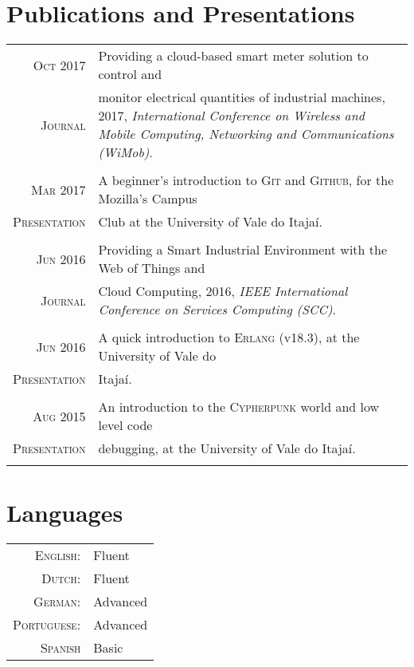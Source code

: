 \documentclass[a4paper,10pt]{article}
\begin{document}
\section{Publications and Presentations}
\begin{tabular}{r|p{11cm}}

\textsc{Oct} 2017 & Providing a cloud-based smart meter solution to control and \\\textsc{Journal} & monitor electrical quantities of industrial machines, 2017, \textit{International Conference on Wireless and Mobile Computing, Networking and Communications (WiMob)}. \normalsize \\\multicolumn{2}{c}{} \\

\textsc{Mar} 2017 & A beginner's introduction to \textsc{Git} and \textsc{Github}, for the Mozilla's Campus \\\textsc{Presentation} & Club at the University of Vale do Itajaí. \normalsize \\\multicolumn{2}{c}{} \\

\textsc{Jun} 2016 & Providing a Smart Industrial Environment with the Web of Things and \\\textsc{Journal} & Cloud Computing, 2016, \textit{IEEE International Conference on Services Computing (SCC)}. \normalsize \\\multicolumn{2}{c}{} \\

\textsc{Jun} 2016 & A quick introduction to \textsc{Erlang} (v18.3), at the University of Vale do \\\textsc{Presentation} & Itajaí.\normalsize \\\multicolumn{2}{c}{} \\

\textsc{Aug} 2015 & An introduction to the \textsc{Cypherpunk} world and low level code \\\textsc{Presentation} & debugging, at the University of Vale do Itajaí. \normalsize \\\multicolumn{2}{c}{} \\



\end{tabular}

\section{Languages}
\begin{tabular}{rp{12cm}}
\textsc{English:} & Fluent \\
\textsc{Dutch:} & Fluent \\
\textsc{German:} & Advanced \\
\textsc{Portuguese:} & Advanced \\
\textsc{Spanish} & Basic
\end{tabular}
\end{document}
